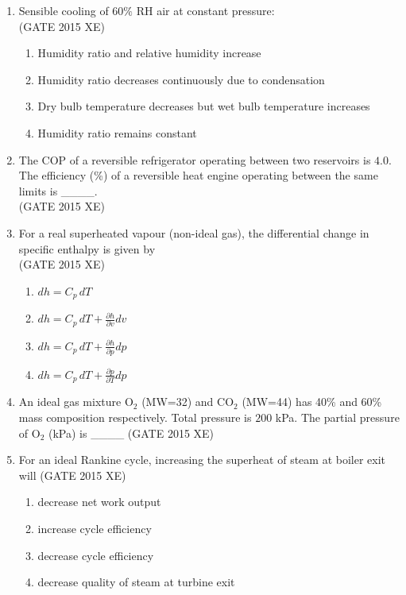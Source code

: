 \documentclass[journal,12pt,onecolumn]{IEEEtran}
\begin{document}
\begin{enumerate}
\item Sensible cooling of $60\%$ RH air at constant pressure:  \\
\hfill{(GATE 2015 XE)} 
\begin{multicols}{2}
\begin{enumerate}
\item Humidity ratio and relative humidity increase
\item Humidity ratio decreases continuously due to condensation
\item Dry bulb temperature decreases but wet bulb temperature increases
\item Humidity ratio remains constant
\end{enumerate}
\end{multicols}

\item The COP of a reversible refrigerator operating between two reservoirs is $4.0$. The efficiency (\%) of a reversible heat engine operating between the same limits is \_\_\_\_. \\
\hfill{(GATE 2015 XE)} 

\item For a real superheated vapour (non-ideal gas), the differential change in specific enthalpy is given by  \\
\hfill{(GATE 2015 XE)} 
\begin{multicols}{2}
\begin{enumerate}
\item $dh = C_p\,dT$
\item $dh = C_p\,dT + \frac{\partial h}{\partial v} dv$
\item $dh = C_p\,dT + \frac{\partial h}{\partial p} dp$
\item $dh = C_p\,dT + \frac{\partial p}{\partial T} dp$
\end{enumerate}
\end{multicols}

\item An ideal gas mixture O$_2$ (MW=32) and CO$_2$ (MW=44) has 40\% and 60\% mass composition respectively. Total pressure is $200$ kPa. The partial pressure of O$_2$ (kPa) is \_\_\_\_
\hfill{(GATE 2015 XE)} \\

\newpage

\item For an ideal Rankine cycle, increasing the superheat of steam at boiler exit will 
\hfill{(GATE 2015 XE)} \\
\begin{multicols}{2}
\begin{enumerate}
\item decrease net work output
\item increase cycle efficiency
\item decrease cycle efficiency
\item decrease quality of steam at turbine exit
\end{enumerate}
\end{multicols}


\end{enumerate}
\end{document}
